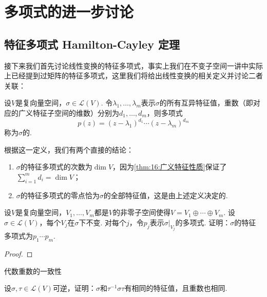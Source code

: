 \chapter{多项式的进一步讨论}

\section{特征多项式 \quad Hamilton-Cayley 定理}

接下来我们首先讨论线性变换的特征多项式，事实上我们在不变子空间一讲中实际上已经提到过矩阵的特征多项式，这里我们将给出线性变换的相关定义并讨论二者关联：
\begin{definition}[特征多项式] 
    设$V$是复向量空间，$\sigma\in \mathcal{L}(V)$. 令$\lambda_1,\ldots,\lambda_m$表示$\sigma$的所有互异特征值，重数（即对应的广义特征子空间的维数）分别为$d_1,\ldots,d_m$，则多项式
    \begin{equation}\label{eq:21:线性变换特征多项式}
        p(z)=(z-\lambda_1)^{d_1}\cdots(z-\lambda_m)^{d_m}
    \end{equation}
    称为$\sigma$的.
\end{definition}

根据这一定义，我们有两个直接的结论：
\begin{enumerate}
    \item $\sigma$的特征多项式的次数为$\dim V$，因为\autoref{thm:16:广义特征性质}保证了$\displaystyle\sum_{i=1}^m d_i=\dim V$；

    \item $\sigma$的特征多项式的零点恰为$\sigma$的全部特征值，这是由上述定义决定的.
\end{enumerate}

\begin{example}
    设$V$是复向量空间，$V_1,\ldots,V_m$都是$V$的非零子空间使得$V=V_1\oplus\cdots\oplus V_m$. 设$\sigma\in \mathcal{L}(V)$，每个$V_j$在$\sigma$下不变. 对每个$j$，令$p_j$表示$\sigma|_{V_j}$的多项式. 证明：$\sigma$的特征多项式为$p_1\cdots p_m$.
\end{example}

\begin{proof}

\end{proof}

代数重数的一致性

\begin{example}
    设$\sigma,\tau\in \mathcal{L}(V)$可逆，证明：$\sigma$和$\tau^{-1}\sigma\tau$有相同的特征值，且重数也相同.
\end{example}

